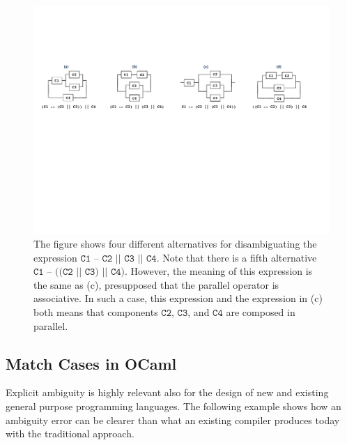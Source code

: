 \documentclass[acmsmall,review,anonymous]{acmart}\settopmatter{printfolios=true,printccs=false,printacmref=false}
\begin{document}
\begin{figure}[!t]
\center
\includegraphics[width=1.0\textwidth]{circuits.pdf}
\caption{The figure shows four different alternatives for disambiguating the expression $\texttt{C1 -- C2 || C3 || C4}$. Note that there is a fifth alternative $\texttt{C1 -- ((C2 || C3) || C4)}$. However, the meaning of this expression is the same as (c), presupposed that the parallel operator is associative. In such a case, this expression and the expression in (c) both means that components $\texttt{C2}$, $\texttt{C3}$, and $\texttt{C4}$ are composed in parallel. }
\label{fig:circuits}
\end{figure}



\subsection{Match Cases in OCaml}

Explicit ambiguity is highly relevant also for the design of new and existing general purpose programming languages. The following example shows how an ambiguity error can be clearer than what an existing compiler produces today with the traditional approach.


\end{document}

